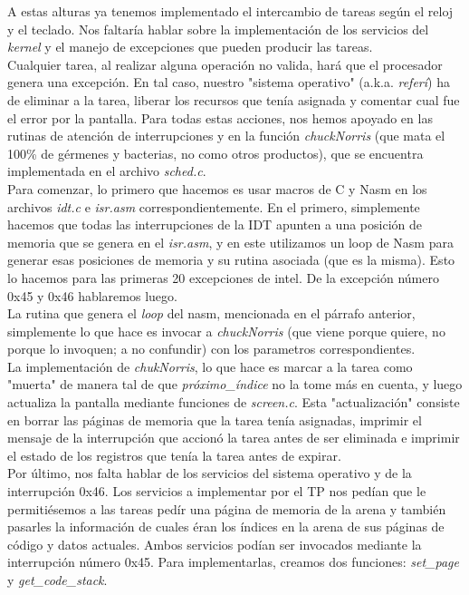 A estas alturas ya tenemos implementado el intercambio de tareas según el reloj y el teclado. Nos faltaría hablar sobre la implementación de los servicios del \textit{kernel} y el manejo de excepciones que pueden producir las tareas.\\

Cualquier tarea, al realizar alguna operación no valida, hará que el procesador genera una excepción. En tal caso, nuestro "sistema operativo" (a.k.a. \textit{referí}) ha de eliminar a la tarea, liberar los recursos que tenía asignada y comentar cual fue el error por la pantalla. Para todas estas acciones, nos hemos apoyado en las rutinas de atención de interrupciones y en la función \textit{chuckNorris} (que mata el 100\% de gérmenes y bacterias, no como otros productos), que se encuentra implementada en el archivo \textit{sched.c}.\\

Para comenzar, lo primero que hacemos es usar macros de C y Nasm en los archivos \textit{idt.c} e \textit{isr.asm} correspondientemente. En el primero, simplemente hacemos que todas las interrupciones de la IDT apunten a una posición de memoria que se genera en el \textit{isr.asm}, y en este utilizamos un loop de Nasm para generar esas posiciones de memoria y su rutina asociada (que es la misma). Esto lo hacemos para las primeras 20 excepciones de intel. De la excepción número 0x45 y 0x46 hablaremos luego.\\

La rutina que genera el \textit{loop} del nasm, mencionada en el párrafo anterior, simplemente lo que hace es invocar a \textit{chuckNorris} (que viene porque quiere, no porque lo invoquen; a no confundir) con los parametros correspondientes.\\

La implementación de \textit{chukNorris}, lo que hace es marcar a la tarea como "muerta" de manera tal de que \textit{próximo\_índice} no la tome más en cuenta, y luego actualiza la pantalla mediante funciones de \textit{screen.c}. Esta "actualización" consiste en borrar las páginas de memoria que la tarea tenía asignadas, imprimir el mensaje de la interrupción que accionó la tarea antes de ser eliminada e imprimir el estado de los registros que tenía la tarea antes de expirar.\\

Por último, nos falta hablar de los servicios del sistema operativo y de la interrupción 0x46. Los servicios a implementar por el TP nos pedían que le permitiésemos a las tareas pedír una página de memoria de la arena y también pasarles la información de cuales éran los índices en la arena de sus páginas de código y datos actuales. Ambos servicios podían ser invocados mediante la interrupción número 0x45. Para implementarlas, creamos dos funciones: \textit{set\_page} y \textit{get\_code\_stack}.\\

